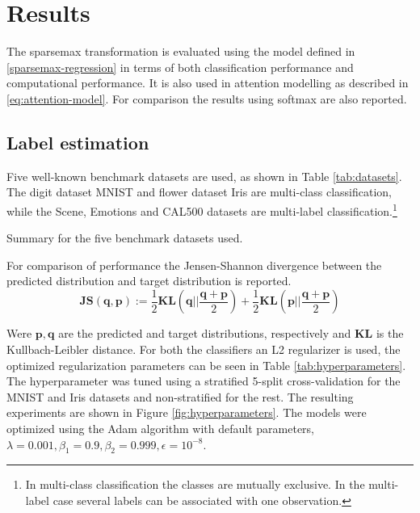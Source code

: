 \section{Results}
The sparsemax transformation is evaluated using the model defined in \eqref{sparsemax-regression} in terms of both classification performance and computational performance. It is also used in attention modelling as described in \eqref{eq:attention-model}. For comparison the results using softmax are also reported.

\subsection{Label estimation}
Five well-known benchmark datasets are used, as shown in Table \ref{tab:datasets}. The digit dataset MNIST and flower dataset Iris are multi-class classification, while the Scene, Emotions and CAL500 datasets are multi-label classification.\footnote{In multi-class classification the classes are mutually exclusive. In the multi-label case several labels can be associated with one observation.} 
\begin{table}[H]
\centering

\caption{Summary for the five benchmark datasets used.}
\label{tab:datasets}
\end{table}
For comparison of performance the Jensen-Shannon divergence between the predicted distribution and target distribution is reported.
\begin{equation*}
\mathbf{JS(q,p)}:=\frac{1}{2}\mathbf{KL}\left(\mathbf{q}\Big|\Big|\frac{\mathbf{q}+\mathbf{p}}{2}\right)+\frac{1}{2}\mathbf{KL}\left(\mathbf{p}\Big|\Big|\frac{\mathbf{q}+\mathbf{p}}{2}\right)
\end{equation*}

Were $\mathbf{p}, \mathbf{q}$ are the predicted and target distributions, respectively and $\mathbf{KL}$ is the Kullbach-Leibler distance. For both the classifiers an L2 regularizer is used, the optimized regularization parameters can be seen in Table \ref{tab:hyperparameters}. The hyperparameter was tuned using a stratified 5-split cross-validation for the MNIST and Iris datasets and non-stratified for the rest. The resulting experiments are shown in Figure \ref{fig:hyperparameters}. The models were optimized using the Adam algorithm with default parameters, $\lambda = 0.001, \beta_1=0.9, \beta_2 = 0.999, \epsilon = 10^{-8}$.

